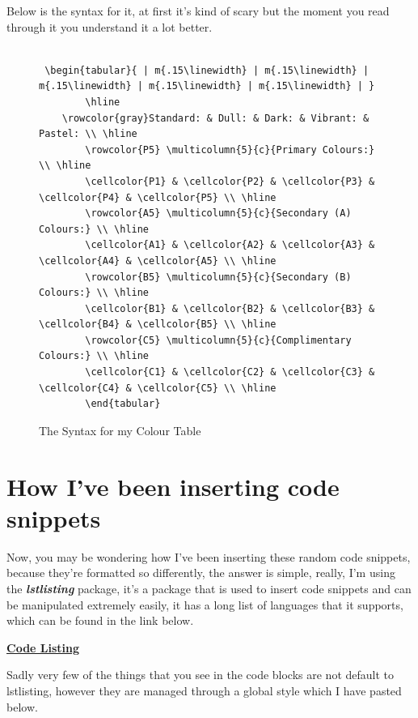 \documentclass[12pt, letterpaper, oneside]{article} \usepackage[utf8]{inputenc}
\begin{document}
Below is the syntax for it, at first it's kind of scary but the moment you read through it you understand it a lot better.

\newpage

\clearpage
\thispagestyle{empty}
\begin{landscape}

	\begin{center}
\begin{figure}[H]
	\begin{lstlisting}

 \begin{tabular}{ | m{.15\linewidth} | m{.15\linewidth} | m{.15\linewidth} | m{.15\linewidth} | m{.15\linewidth} | } 
        \hline
	\rowcolor{gray}Standard: & Dull: & Dark: & Vibrant: & Pastel: \\ \hline
        \rowcolor{P5} \multicolumn{5}{c}{Primary Colours:} \\ \hline
        \cellcolor{P1} & \cellcolor{P2} & \cellcolor{P3} & \cellcolor{P4} & \cellcolor{P5} \\ \hline
        \rowcolor{A5} \multicolumn{5}{c}{Secondary (A) Colours:} \\ \hline
        \cellcolor{A1} & \cellcolor{A2} & \cellcolor{A3} & \cellcolor{A4} & \cellcolor{A5} \\ \hline
        \rowcolor{B5} \multicolumn{5}{c}{Secondary (B) Colours:} \\ \hline
        \cellcolor{B1} & \cellcolor{B2} & \cellcolor{B3} & \cellcolor{B4} & \cellcolor{B5} \\ \hline
        \rowcolor{C5} \multicolumn{5}{c}{Complimentary Colours:} \\ \hline
        \cellcolor{C1} & \cellcolor{C2} & \cellcolor{C3} & \cellcolor{C4} & \cellcolor{C5} \\ \hline
        \end{tabular}

	\end{lstlisting}
	\centering
	\caption{The Syntax for my Colour Table}
\end{figure}
	\end{center}

\end{landscape}

\section{How I've been inserting code snippets}

Now, you may be wondering how I've been inserting these random code snippets, because they're formatted so differently, the answer is simple, really, I'm using the \textbf{\emph{lstlisting}} package, it's a package that is used to insert code snippets and can be manipulated extremely easily, it has a long list of languages that it supports, which can be found in the link below. 
\\
\begin{center}
\textbf{\href{https://www.sharelatex.com/learn/Code\_listing}{Code Listing}}
\end{center}
Sadly very few of the things that you see in the code blocks are not default to lstlisting, however they are managed through a global style which I have pasted below.
\end{document}
